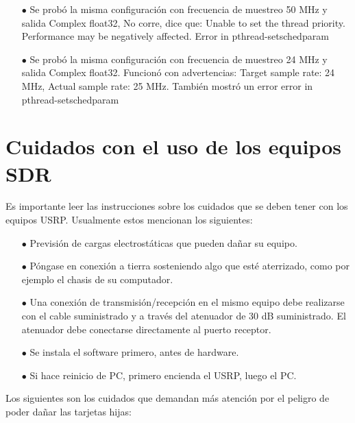 \begin{itemize}
\begin{itemize}
			\item [$\bullet$] Se probó la misma configuración con frecuencia de muestreo 50 MHz y salida Complex float32, No corre, dice que: Unable to set the thread priority. Performance may be negatively affected. Error in pthread-setschedparam
			\item [$\bullet$] Se probó la misma configuración con frecuencia de muestreo 24 MHz y salida Complex float32. Funcionó con advertencias: Target sample rate: 24 MHz, Actual sample rate: 25 MHz. También mostró un error error in pthread-setschedparam
			
	\end{itemize}
\end{itemize}


\section{Cuidados con el uso de los equipos SDR}

Es importante leer las instrucciones sobre los cuidados que se deben tener con los equipos USRP. Usualmente estos mencionan los siguientes: \\

\begin{itemize}
	\item [$\bullet$] Previsión de cargas electrostáticas que pueden dañar su equipo.
	\item [$\bullet$] Póngase en conexión a tierra sosteniendo algo que esté aterrizado, como por ejemplo el chasis de su computador.
	\item [$\bullet$] Una conexión de transmisión/recepción en el mismo equipo debe realizarse con el cable suministrado y a través del atenuador de 30 dB suministrado. El atenuador debe conectarse directamente al puerto receptor.
	\item [$\bullet$] Se instala el software primero, antes de hardware.
	\item [$\bullet$] Si hace reinicio de PC, primero encienda el USRP, luego el PC.	
\end{itemize}

Los siguientes son los cuidados que demandan más atención por el peligro de poder dañar las tarjetas hijas:

